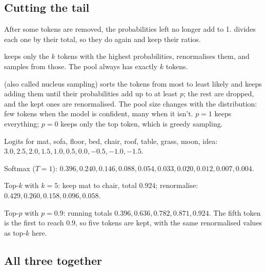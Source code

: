 \subsection*{Cutting the tail}

\begin{definition}[Renormalising]
After some tokens are removed, the probabilities left no longer add to 1.  divides each one by their total, so they do again and keep their ratios.
\end{definition}

\begin{definition}
 keeps only the $k$ tokens with the highest probabilities, renormalises them, and samples from those. The pool always has exactly $k$ tokens.
\end{definition}

\begin{definition}
 (also called nucleus sampling) sorts the tokens from most to least likely and keeps adding them until their probabilities add up to at least $p$; the rest are dropped, and the kept ones are renormalised. The pool size changes with the distribution: few tokens when the model is confident, many when it isn't. $p = 1$ keeps everything; $p = 0$ keeps only the top token, which is greedy sampling.
\end{definition}

\begin{example}
Logits for mat, sofa, floor, bed, chair, roof, table, grass, moon, idea: $3.0, 2.5, 2.0, 1.5, 1.0, 0.5, 0.0, -0.5, -1.0, -1.5$.
\begin{steps}
  \item Softmax ($T = 1$): $0.396, 0.240, 0.146, 0.088, 0.054, 0.033, 0.020, 0.012, 0.007, 0.004$.
  \item Top-$k$ with $k = 5$: keep mat to chair, total $0.924$; renormalise: $0.429, 0.260, 0.158, 0.096, 0.058$.
  \item Top-$p$ with $p = 0.9$: running totals $0.396, 0.636, 0.782, 0.871, 0.924$. The fifth token is the first to reach $0.9$, so five tokens are kept, with the same renormalised values as top-$k$ here.
\end{steps}
\end{example}

\subsection*{All three together}

